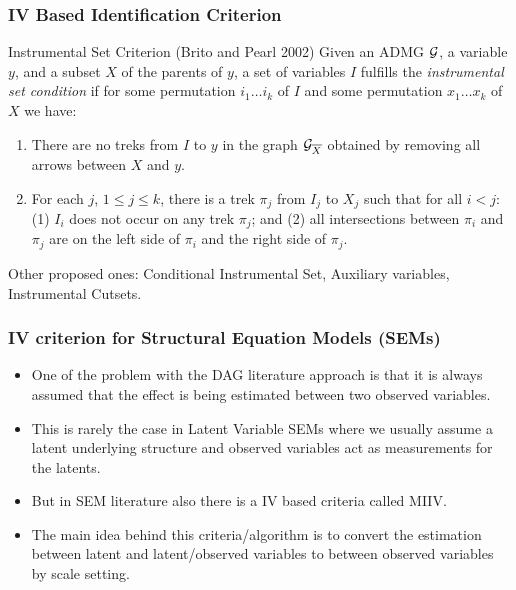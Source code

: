 \documentclass{beamer}
\begin{document}
\begin{frame}
	\frametitle{IV Based Identification Criterion}
	\begin{block}{Instrumental Set Criterion (Brito and Pearl 2002)}
		Given an ADMG $\cal G$, a variable $y$, and a subset $X$ of the
		parents of $y$,  a set of variables $I$ fulfills the
		\emph{instrumental set condition} if for {some} permutation $
		i_1 \ldots i_k $ of $ I $ and {some} permutation $ x_1 \ldots
		x_k $ of $ X $ we have: 
	\begin{enumerate}
		\item There are no treks from $I$ to $y$ in the graph ${\cal
			G}_{\overline{X}}$ obtained by removing all arrows
			between $X$ and $y$. 
		\item For each $j$, $1 \leq j \leq k$, there is a trek $\pi_j$ from
			$I_j$ to $X_j$ such that for all $i < j$: (1) $I_i$ does not
			occur on any trek $\pi_j$; and (2) all intersections between
			$\pi_i$ and $\pi_j$ are on the left side of $\pi_i$ and the
			right side of $\pi_j$.
	\end{enumerate}
	\end{block}
	Other proposed ones: Conditional Instrumental Set, Auxiliary variables, Instrumental Cutsets.
\end{frame}

\begin{frame}
	\frametitle{IV criterion for Structural Equation Models (SEMs)}
	\begin{itemize}
		\item One of the problem with the DAG literature approach is that it is always assumed that 
			the effect is being estimated between two observed variables.
		\item This is rarely the case in Latent Variable SEMs where we usually
			assume a latent underlying structure and observed variables
			act as measurements for the latents.
		\item But in SEM literature also there is a IV based criteria called MIIV.
		\item The main idea behind this criteria/algorithm is to convert the estimation between latent and latent/observed variables to 
			between observed variables by scale setting.
	\end{itemize}
\end{frame}
\end{document}
